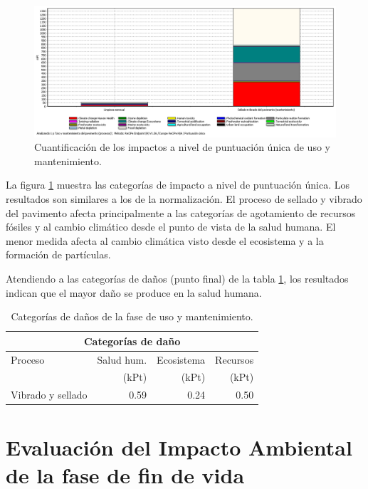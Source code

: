 \begin{figure}[!htb]
\centering
\includegraphics[width=15cm]{img/uso_puntuacionunica.png}
\caption{Cuantificación de los impactos a nivel de puntuación única de uso y mantenimiento.}
\label{fig:uso_puntuacionunica}
\end{figure}

La figura \ref{fig:uso_puntuacionunica} muestra las categorías de impacto a nivel de puntuación única. Los resultados son similares a los de la normalización. El proceso de sellado y vibrado del pavimento afecta principalmente a las categorías de agotamiento de recursos fósiles y al cambio climático desde el punto de vista de la salud humana. El menor medida afecta al cambio climática visto desde el ecosistema y a la formación de partículas.

Atendiendo a las categorías de daños (punto final) de la tabla \ref{categoriasdanosuso}, los resultados indican que el mayor daño se produce en la salud humana.

\begin{table}[!htb]
\centering
\begin{tabular}{p{6cm}rrr}
\toprule
\multicolumn{4}{c}{Categorías de daño}\\
\midrule
Proceso & Salud hum. & Ecosistema & Recursos\\
& (kPt) &  (kPt) &  (kPt)\\
\midrule
Vibrado y sellado & 0.59 & 0.24 & 0.50\\
\bottomrule
\end{tabular}
\caption{Categorías de daños de la fase de uso y mantenimiento.}
\label{categoriasdanosuso}
\end{table}

\section{Evaluación del Impacto Ambiental de la fase de fin de vida}

